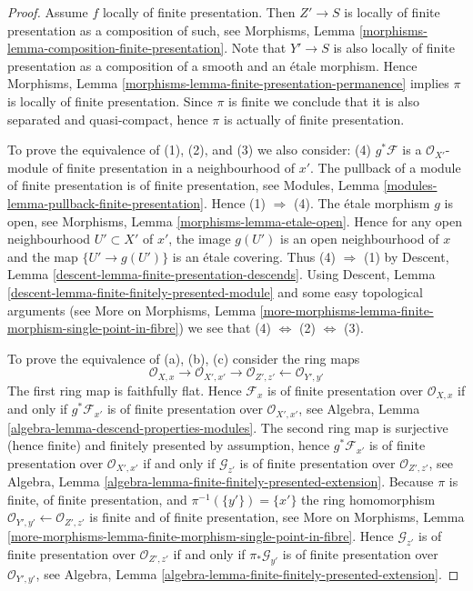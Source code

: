 \begin{proof}
Assume $f$ locally of finite presentation. Then $Z' \to S$ is locally
of finite presentation as a composition of such, see
Morphisms, Lemma \ref{morphisms-lemma-composition-finite-presentation}.
Note that $Y' \to S$ is also locally of finite presentation as a composition
of a smooth and an \'etale morphism. Hence
Morphisms, Lemma \ref{morphisms-lemma-finite-presentation-permanence}
implies $\pi$ is locally of finite presentation.
Since $\pi$ is finite we conclude that it is also separated and
quasi-compact, hence $\pi$ is actually of finite presentation.

\medskip\noindent
To prove the equivalence of (1), (2), and (3) we also consider:
(4) $g^*\mathcal{F}$ is a $\mathcal{O}_{X'}$-module of finite presentation
in a neighbourhood of $x'$. The pullback of a module of finite presentation
is of finite presentation, see
Modules, Lemma \ref{modules-lemma-pullback-finite-presentation}.
Hence (1) $\Rightarrow$ (4).
The \'etale morphism $g$ is open, see
Morphisms, Lemma \ref{morphisms-lemma-etale-open}.
Hence for any open neighbourhood $U' \subset X'$ of $x'$, the image
$g(U')$ is an open neighbourhood of $x$ and the map
$\{U' \to g(U')\}$ is an \'etale covering. Thus (4) $\Rightarrow$ (1) by
Descent, Lemma \ref{descent-lemma-finite-presentation-descends}.
Using
Descent, Lemma \ref{descent-lemma-finite-finitely-presented-module}
and some easy topological arguments (see
More on Morphisms,
Lemma \ref{more-morphisms-lemma-finite-morphism-single-point-in-fibre})
we see that
(4) $\Leftrightarrow$ (2) $\Leftrightarrow$ (3).

\medskip\noindent
To prove the equivalence of (a), (b), (c) consider the ring maps
$$
\mathcal{O}_{X, x} \to
\mathcal{O}_{X', x'} \to
\mathcal{O}_{Z', z'} \leftarrow
\mathcal{O}_{Y', y'}
$$
The first ring map is faithfully flat. Hence
$\mathcal{F}_x$ is of finite presentation over $\mathcal{O}_{X, x}$
if and only if $g^*\mathcal{F}_{x'}$ is of finite presentation over
$\mathcal{O}_{X', x'}$, see
Algebra, Lemma \ref{algebra-lemma-descend-properties-modules}.
The second ring map is surjective (hence finite) and
finitely presented by assumption, hence
$g^*\mathcal{F}_{x'}$ is of finite presentation over $\mathcal{O}_{X', x'}$
if and only if $\mathcal{G}_{z'}$ is of finite presentation over
$\mathcal{O}_{Z', z'}$, see
Algebra, Lemma \ref{algebra-lemma-finite-finitely-presented-extension}.
Because $\pi$ is finite, of finite presentation, and
$\pi^{-1}(\{y'\}) = \{x'\}$ the ring homomorphism
$\mathcal{O}_{Y', y'} \leftarrow \mathcal{O}_{Z', z'}$ is finite
and of finite presentation, see
More on Morphisms,
Lemma \ref{more-morphisms-lemma-finite-morphism-single-point-in-fibre}.
Hence $\mathcal{G}_{z'}$ is of finite presentation over $\mathcal{O}_{Z', z'}$
if and only if $\pi_*\mathcal{G}_{y'}$ is of finite presentation over
$\mathcal{O}_{Y', y'}$, see
Algebra, Lemma \ref{algebra-lemma-finite-finitely-presented-extension}.
\end{proof}

